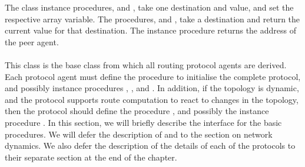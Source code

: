 The class instance procedures,
 and
,
take one destination and value, and set the respective array variable.
The procedures,
 and
,
take a destination and return the current value for that destination.
The instance procedure
returns the address of the peer agent.

\paragraph{}
This class is the base class from
which all routing protocol agents are derived.
Each protocol agent must define the procedure
to initialise the complete protocol,
and possibly instance procedures , , and
.
In addition, if the topology is dynamic, and the protocol supports 
route computation to react to changes in the topology,
then the protocol should define the procedure , and
possibly the instance procedure .
In this section, we will briefly describe the interface for the basic
procedures.
We will defer the description of  and
to the section on network dynamics.
We also defer the description of the details of each of the protocols
to their separate section at the end of the chapter.
